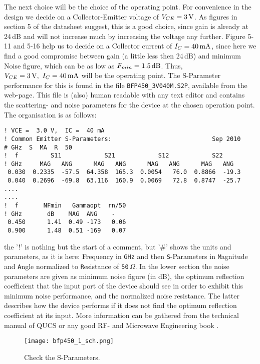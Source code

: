 The next choice will be the choice of the operating point. For
convenience in the design we decide on a Collector-Emitter voltage of
$V_{CE}=3\,\mathrm{V}$. As figures in section 5 of the datasheet
suggest, this is a good choice, since gain is already at 24\,dB and
will  not increase much by increasing the voltage any further. Figure
5-11 and 5-16 help us to decide on a Collector current of
$I_C=40\,\mathrm{mA}$, since here we find a good compromise between gain (a
little less then 24\,dB) and minimum Noise figure, which can be as low
as $F_{min}=1.5\,\mathrm{dB}$. Thus, $V_{CE}=3\,\mathrm{V},\ I_{C}=40\,\mathrm{mA}$
will be the operating point. The S-Parameter performance for this is
found in the file \texttt{BFP450\_3V040M.S2P}, available from the
web-page. This file is (also) human readable with any text editor and
contains the scattering- and noise parameters for the device at the
chosen operation point. The organisation is as follows:

\begin{verbatim}
! VCE =  3.0 V,  IC =  40 mA
! Common Emitter S-Parameters:                            Sep 2010
# GHz  S  MA  R  50
!  f         S11            S21            S12            S22
! GHz     MAG   ANG      MAG   ANG      MAG   ANG      MAG   ANG
 0.030  0.2335  -57.5  64.358  165.3  0.0054   76.0  0.8866  -19.3
 0.040  0.2696  -69.8  63.116  160.9  0.0069   72.8  0.8747  -25.7
....
....
!  f       NFmin   Gammaopt  rn/50
! GHz       dB    MAG  ANG    -
 0.450      1.41  0.49 -173   0.06
 0.900      1.48  0.51 -169   0.07
\end{verbatim}

the '!' is nothing but the start of a comment, but '\#' shows the
units and parameters, as it is here: Frequency in \texttt{GHz} and then
\texttt{S}-Parameters in \texttt{M}agnitude and \texttt{A}ngle normalized to
\texttt{R}esistance of \texttt{50}$\,\Omega$. In the lower section the noise
parameters are given as minimum noise figure (in dB), the optimum
reflection coefficient that the input port of the device should see in
order to exhibit this minimum noise performance, and the normalized
noise resistance. The latter describes how the device performs if
it does not find the optimum reflection coefficient at its input. More
information can be gathered from the technical manual of QUCS or any
good RF- and Microwave Engineering book \cite{qucs,col91,poz05}.

\begin{figure}
  \centering
  {\texttt{[image: bfp450\_1\_sch.png]}}
  \caption{Check the S-Parameters.}
  \label{fig:bfp450_1_sch}
\end{figure}


